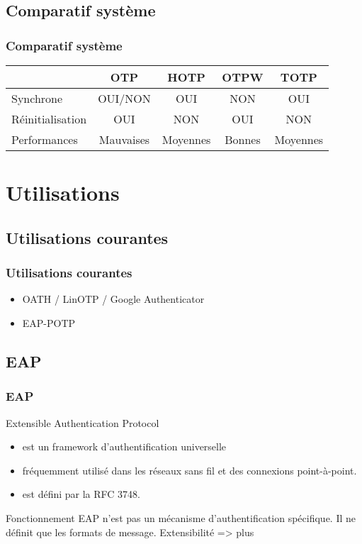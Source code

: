 \documentclass{beamer}
\begin{document}
\subsection{Comparatif système}
\begin{frame}
\frametitle{Comparatif système}
\begin{tabular}{|l|c|c|c|c|}
 \hline
 & OTP & HOTP & OTPW & TOTP\\
 \hline
 Synchrone & OUI/NON & OUI & NON & OUI \\
 \hline
 Réinitialisation & OUI & NON & OUI & NON \\
 \hline
 Performances & Mauvaises & Moyennes & Bonnes & Moyennes\\
 \hline
  \end{tabular}
\end{frame}

\section{Utilisations}
\subsection{Utilisations courantes}
\begin{frame}
\frametitle{Utilisations courantes}
\begin{itemize}
 \item OATH / LinOTP / Google Authenticator
 \item EAP-POTP
\end{itemize}
\end{frame}


\subsection{EAP}
  \begin{frame}
  \frametitle{EAP}
        \begin{block}{Extensible Authentication Protocol }
\begin{itemize}
\item est un framework d'authentification universelle
\item fréquemment utilisé dans les réseaux sans fil et des connexions point-à-point.
\item est défini par la RFC 3748.
\end{itemize}
    \end{block}
        \begin{block}{Fonctionnement}
EAP n'est pas un mécanisme d'authentification spécifique. Il ne définit que les formats de message.
Extensibilité => plus
\end{block}
  \end{frame}
  
\end{document}

